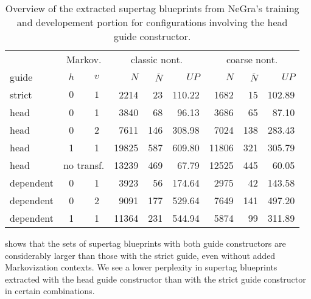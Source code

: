 \documentclass[../../document.tex]{subfiles}
\begin{document}
    \begin{table}
        \caption{\label{tbl:gridsearch:head:1}
        Overview of the extracted supertag blueprints from NeGra's training and developement portion for configurations involving the head guide constructor.
        }
        \centering
        \vspace{.2cm}
        \begin{tabular}{lcc|rrr|rrr}
            \toprule
            & \multicolumn{2}{c|}{Markov.} & \multicolumn{3}{c|}{classic nont.} &  \multicolumn{3}{c}{coarse nont.} \\
guide      & \(h\) & \(v\) & $N$ & $\overline{N}$ & $\mathit{UP}$ & $N$ & $\overline{N}$ & $\mathit{UP}$  \\ \hline \rowcolor{black!10}
strict     & \(0\) & \(1\) & 2214 & 23 & 110.22 & 1682 & 15 & 102.89 \\\hline
head & 0 & 1 & 3840 & 68 & 96.13 & 3686 & 65 & 87.10 \\
head & 0 & 2 & 7611 & 146 & 308.98 & 7024 & 138 & 283.43 \\
head & 1 & 1 & 19825 & 587 & 609.80 & 11806 & 321 & 305.79 \\
head & \multicolumn{2}{c|}{no transf.}  & 13239 & 469 & 67.79 & 12525 & 445 & 60.05 \\ \hline
dependent & 0 & 1 & 3923 & 56 & 174.64 & 2975 & 42 & 143.58 \\
dependent & 0 & 2 & 9091 & 177 & 529.64 & 7649 & 141 & 497.20 \\
dependent & 1 & 1 & 11364 & 231 & 544.94 & 5874 & 99 & 311.89 \\
\bottomrule
        \end{tabular}
    \end{table}

     shows that the sets of supertag blueprints with both guide constructors are considerably larger than those with the strict guide, even without added Markovization contexts.
    We see a lower perplexity in supertag blueprints extracted with the head guide constructor than with the strict guide constructor in certain combinations.
\end{document}
